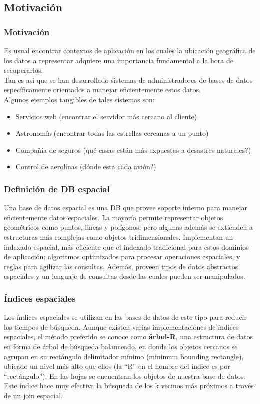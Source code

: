 
\subsection{Motivación}

\begin{frame}
		\frametitle{Motivación}
		Es usual encontrar contextos de aplicación en los cuales la ubicación geográfica de los datos a representar adquiere una importancia fundamental a la hora de recuperarlos. \pause \\
		Tan es asi que se han desarrollado sistemas de administradores de bases de datos específicamente orientados a manejar eficientemente estos datos. \pause \\
		Algunos ejemplos tangibles de tales sistemas son:
		\begin{itemize}
				\item	Servicios web (encontrar el servidor más cercano al cliente) \pause
				\item	Astronomía (encontrar todas las estrellas cercanas a un punto) \pause
				\item	Compañía de seguros (qué casas están más expuestas a desastres naturales?) \pause
				\item	Control de aerolínas (dónde está cada avión?)
		\end{itemize}
\end{frame}

\begin{frame}
		\frametitle{Definición de DB espacial}
		Una base de datos espacial es una DB que provee soporte interno para manejar eficientemente datos espaciales. \pause
		La mayoría permite representar objetos geométricos como puntos, lineas y polígonos; pero algunas además se extienden a estructuras más complejas como objetos tridimensionales. \pause
		Implementan un indexado espacial, más eficiente que el indexado tradicional para estos dominios de aplicación; algoritmos optimizados para procesar operaciones espaciales, y reglas para agilizar las consultas. \pause
		Además, proveen tipos de datos abstractos espaciales y un lenguaje de consultas desde las cuales pueden ser manipulados.
\end{frame}

\begin{frame}
		\frametitle{Índices espaciales}
		Los índices espaciales se utilizan en las bases de datos de este tipo para reducir los tiempos de búsqueda. \pause
		Aunque existen varias implementaciones de índices espaciales, el método preferido se conoce como {\bf árbol-R}, una estructura de datos en forma de árbol de búsqueda balanceado, en donde los objetos cercanos se agrupan en su rectángulo delimitador mínimo (minimum bounding rectangle), ubicado un nivel más alto que ellos (la ``R'' en el nombre del índice es por ``rectángulo''). \pause
		En las hojas se encuentran los objetos de nuestra base de datos. \pause
		Este índice hace muy efectiva la búsqueda de los k vecinos más próximos a través de un join espacial.
\end{frame}

